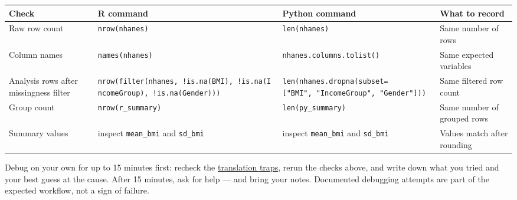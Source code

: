 \documentclass[
  letterpaper,
  DIV=11,
  numbers=noendperiod,
  oneside]{scrreprt}
\begin{document}
\begin{longtable}[]{@{}
  >{\raggedright\arraybackslash}p{}
  >{\raggedright\arraybackslash}p{}
  >{\raggedright\arraybackslash}p{}
  >{\raggedright\arraybackslash}p{}@{}}
\toprule\noalign{}
\begin{minipage}[b]{\linewidth}\raggedright
Check
\end{minipage} & \begin{minipage}[b]{\linewidth}\raggedright
R command
\end{minipage} & \begin{minipage}[b]{\linewidth}\raggedright
Python command
\end{minipage} & \begin{minipage}[b]{\linewidth}\raggedright
What to record
\end{minipage} \\
\midrule\noalign{}
\endhead
\bottomrule\noalign{}
\endlastfoot
Raw row count & \texttt{nrow(nhanes)} & \texttt{len(nhanes)} & Same
number of rows \\
Column names & \texttt{names(nhanes)} & \texttt{nhanes.columns.tolist()}
& Same expected variables \\
Analysis rows after missingness filter &
\texttt{nrow(filter(nhanes,\ !is.na(BMI),\ !is.na(IncomeGroup),\ !is.na(Gender)))}
&
\texttt{len(nhanes.dropna(subset={[}"BMI",\ "IncomeGroup",\ "Gender"{]}))}
& Same filtered row count \\
Group count & \texttt{nrow(r\_summary)} & \texttt{len(py\_summary)} &
Same number of grouped rows \\
Summary values & inspect \texttt{mean\_bmi} and \texttt{sd\_bmi} &
inspect \texttt{mean\_bmi} and \texttt{sd\_bmi} & Values match after
rounding \\
\end{longtable}

\begin{tcolorbox}[enhanced jigsaw, title=\textcolor{quarto-callout-note-color}{\faInfo}\hspace{0.5em}{When results do not match: the 15-minute rule}, arc=.35mm, toptitle=1mm, colframe=quarto-callout-note-color-frame, toprule=.15mm, leftrule=.75mm, bottomtitle=1mm, opacityback=0, bottomrule=.15mm, coltitle=black, breakable, opacitybacktitle=0.6, titlerule=0mm, colback=white, left=2mm, colbacktitle=quarto-callout-note-color!10!white, rightrule=.15mm]

Debug on your own for up to 15 minutes first: recheck the
\href{python04-translation-traps.qmd}{translation traps}, rerun the
checks above, and write down what you tried and your best guess at the
cause. After 15 minutes, ask for help --- and bring your notes.
Documented debugging attempts are part of the expected workflow, not a
sign of failure.

\end{tcolorbox}
\end{document}
